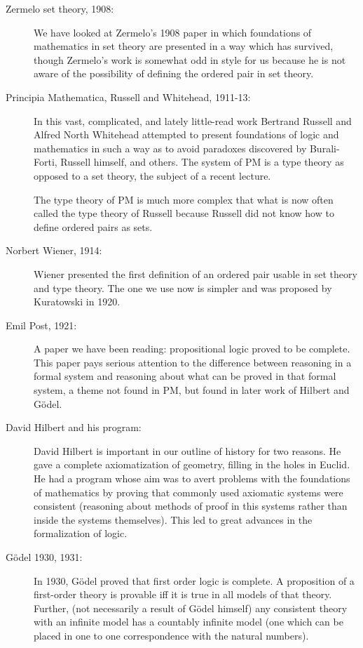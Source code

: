 \documentclass[12pt]{article}
\begin{document}
\begin{description}
\item[Zermelo set theory, 1908:]  We have looked at Zermelo's 1908 paper in which foundations of mathematics in set theory are presented in a way which has survived, though
Zermelo's work is somewhat odd in style for us because he is not aware of the possibility of defining the ordered pair in set theory.

\item[Principia Mathematica, Russell and Whitehead, 1911-13:]  In this vast, complicated, and lately little-read work Bertrand Russell and Alfred North Whitehead attempted to present
foundations of logic and mathematics in such a way as to avoid paradoxes discovered by Burali-Forti, Russell himself, and others.  The system of PM is a type theory as opposed to a set theory, the subject of a recent lecture.

The type theory of PM is much more complex that what is now often called the type theory of Russell because Russell did not know how to define ordered pairs as sets.

\item[Norbert Wiener, 1914:]  Wiener presented the first definition of an ordered pair usable in set theory and type theory.  The one we use now is simpler and was proposed by Kuratowski in 1920.

\item[Emil Post, 1921:]  A paper we have been reading:  propositional logic proved to be complete.  This paper pays serious attention to the difference between reasoning in a formal system and reasoning about what can be proved in that formal system, a theme not found in PM, but found in later work of Hilbert and G\"odel.

\item[David Hilbert and his program:]  David Hilbert is important in our outline of history for two reasons.  He gave a complete axiomatization of geometry, filling in the holes in Euclid.
He had a program whose aim was to avert problems with the foundations of mathematics by proving that commonly used axiomatic systems were consistent (reasoning about methods of proof in this systems rather than inside the systems themselves).  This led to great advances in the formalization of logic.

\item[G\"odel 1930, 1931:]  In 1930, G\"odel proved that first order logic is complete.  A proposition of a first-order theory is provable iff it is true in all models of that theory.  Further,
(not necessarily a result of G\"odel himself) any consistent theory with an infinite model has a countably infinite model (one which can be placed in one to one correspondence with the natural numbers).


\end{description}
\end{document}

